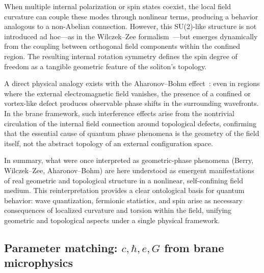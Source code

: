 When multiple internal polarization or spin states coexist, the local
field curvature can couple these modes through nonlinear terms,
producing a behavior analogous to a non-Abelian connection. However,
this SU(2)-like structure is not introduced ad hoc—as in the
Wilczek–Zee formalism~\cite{WilczekZee1984}—but emerges dynamically from the coupling between
orthogonal field components within the confined region. The resulting
internal rotation symmetry defines the spin degree of freedom as a
tangible geometric feature of the soliton's topology.

A direct physical analogy exists with the Aharonov–Bohm effect~\cite{AharonovBohm1959}: even in
regions where the external electromagnetic field vanishes, the presence
of a confined or vortex-like defect produces observable phase shifts in
the surrounding wavefronts. In the brane framework, such interference
effects arise from the nontrivial circulation of the internal field
connection around topological defects, confirming that the essential
cause of quantum phase phenomena is the geometry of the field itself,
not the abstract topology of an external configuration space.

In summary, what were once interpreted as geometric-phase phenomena
(Berry, Wilczek–Zee, Aharonov–Bohm) are here understood as emergent
manifestations of real geometric and topological structure in a
nonlinear, self-confining field medium. This reinterpretation provides a
clear ontological basis for quantum behavior: wave quantization,
fermionic statistics, and spin arise as necessary consequences of
localized curvature and torsion within the field, unifying geometric and
topological aspects under a single physical framework.

\subsection{Parameter matching: \texorpdfstring{$c,\hbar,e,G$}{c,hbar,e,G} from brane microphysics}
\label{sec:param-matching}

